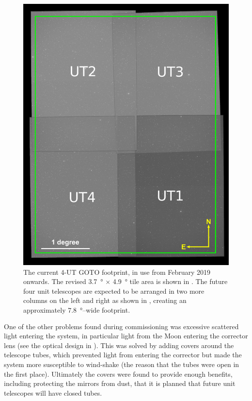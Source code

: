 \begin{colsection}
\begin{figure}[p]
    \begin{center}
        \includegraphics[width=0.55\linewidth]{images/footprint_2_box.png}
    \end{center}
    \caption[The current 4-UT GOTO footprint]{
        The current 4-UT GOTO footprint, in use from February 2019 onwards.
        The revised \SI{3.7}{\degree} $\times$ \SI{4.9}{\degree} tile area is shown in . The future four unit telescopes are expected to be arranged in two more columns on the left and right as shown in , creating an approximately \SI{7.8}{\degree}--wide footprint.
    }\label{fig:4ut_footprint}
\end{figure}

\newpage

One of the other problems found during commissioning was excessive scattered light entering the system, in particular light from the Moon entering the corrector lens (see the optical design in ). This was solved by adding covers around the telescope tubes, which prevented light from entering the corrector but made the system more susceptible to wind-shake (the reason that the tubes were open in the first place). Ultimately the covers were found to provide enough benefits, including protecting the mirrors from dust, that it is planned that future unit telescopes will have closed tubes.


\end{colsection}
